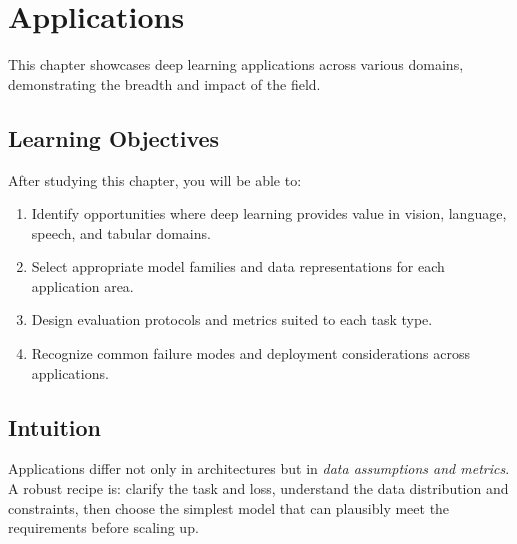 
\chapter{Applications}
\label{chap:applications}

This chapter showcases deep learning applications across various domains, demonstrating the breadth and impact of the field.


\section*{Learning Objectives}

After studying this chapter, you will be able to:

\begin{enumerate}
    \item Identify opportunities where deep learning provides value in vision, language, speech, and tabular domains.
    \item Select appropriate model families and data representations for each application area.
    \item Design evaluation protocols and metrics suited to each task type.
    \item Recognize common failure modes and deployment considerations across applications.
\end{enumerate}



\section*{Intuition}

Applications differ not only in architectures but in \emph{data assumptions and metrics}. A robust recipe is: clarify the task and loss, understand the data distribution and constraints, then choose the simplest model that can plausibly meet the requirements before scaling up.














